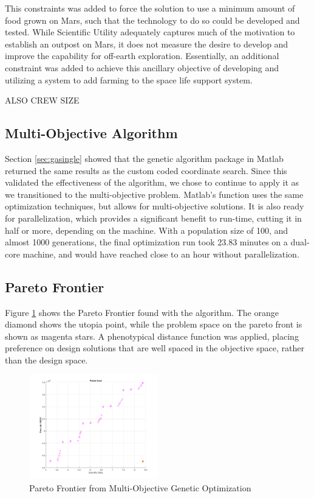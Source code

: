 \documentclass[]{aiaa-pretty}
\begin{document}
This constraints was added to force the solution to use a minimum amount of food grown on Mars, such that the technology to do so could be developed and tested. While Scientific Utility adequately captures much of the motivation to establish an outpost on Mars, it does not measure the desire to develop and improve the capability for off-earth exploration. Essentially, an additional constraint was added to achieve this ancillary objective of developing and utilizing a system to add farming to the space life support system.

ALSO CREW SIZE
\subsection{Multi-Objective Algorithm}
Section \ref{sec:gasingle} showed that the genetic algorithm package in Matlab returned the same results as the custom coded coordinate search.  Since this validated the effectiveness of the  algorithm, we chose to continue to apply it as we transitioned to the multi-objective problem.  Matlab's  function uses the same optimization techniques, but allows for multi-objective solutions.  It is also ready for parallelization, which provides a significant benefit to run-time, cutting it in half or more, depending on the machine. With a population size of 100, and almost 1000 generations, the final optimization run took 23.83 minutes on a dual-core machine, and would have reached close to an hour without parallelization.

\subsection{Pareto Frontier}
Figure \ref{fig:gamultipareto} shows the Pareto Frontier found with the  algorithm.  The orange diamond shows the utopia point, while the problem space on the pareto front is shown as magenta stars. A phenotypical distance function was applied, placing preference on design solutions that are well spaced in the objective space, rather than the design space.
\begin{figure}[h!]
	\centering
	\includegraphics[width=0.5\textwidth]{ga-multi-pareto}
	\caption{Pareto Frontier from Multi-Objective Genetic Optimization}
	\label{fig:gamultipareto}
\end{figure}
\end{document}
